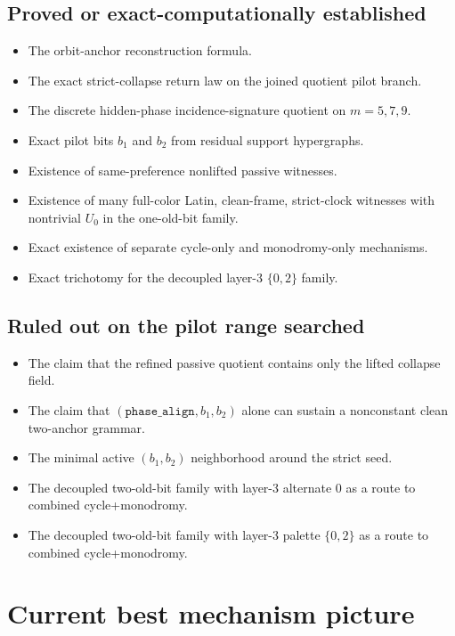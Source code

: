 \documentclass[11pt]{article}
\begin{document}
\subsection*{Proved or exact-computationally established}
\begin{itemize}
    \item The orbit-anchor reconstruction formula.
    \item The exact strict-collapse return law on the joined quotient pilot branch.
    \item The discrete hidden-phase incidence-signature quotient on $m=5,7,9$.
    \item Exact pilot bits $b_1$ and $b_2$ from residual support hypergraphs.
    \item Existence of same-preference nonlifted passive witnesses.
    \item Existence of many full-color Latin, clean-frame, strict-clock witnesses with nontrivial $U_0$ in the one-old-bit family.
    \item Exact existence of separate cycle-only and monodromy-only mechanisms.
    \item Exact trichotomy for the decoupled layer-3 $\{0,2\}$ family.
\end{itemize}

\subsection*{Ruled out on the pilot range searched}
\begin{itemize}
    \item The claim that the refined passive quotient contains only the lifted collapse field.
    \item The claim that $(\texttt{phase\_align},b_1,b_2)$ alone can sustain a nonconstant clean two-anchor grammar.
    \item The minimal active $(b_1,b_2)$ neighborhood around the strict seed.
    \item The decoupled two-old-bit family with layer-3 alternate $0$ as a route to combined cycle+monodromy.
    \item The decoupled two-old-bit family with layer-3 palette $\{0,2\}$ as a route to combined cycle+monodromy.
\end{itemize}

\section*{Current best mechanism picture}
\end{document}

